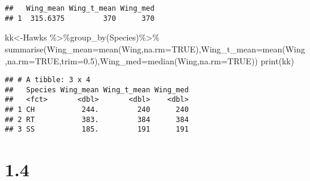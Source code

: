 \documentclass[
]{article}
\newenvironment{Shaded}{\begin{snugshade}}{\end{snugshade}}
\newcommand{\AttributeTok}[1]{\textcolor[rgb]{0.77,0.63,0.00}{#1}}
\newcommand{\ConstantTok}[1]{\textcolor[rgb]{0.00,0.00,0.00}{#1}}
\newcommand{\DecValTok}[1]{\textcolor[rgb]{0.00,0.00,0.81}{#1}}
\newcommand{\FloatTok}[1]{\textcolor[rgb]{0.00,0.00,0.81}{#1}}
\newcommand{\FunctionTok}[1]{\textcolor[rgb]{0.00,0.00,0.00}{#1}}
\newcommand{\NormalTok}[1]{#1}
\newcommand{\OtherTok}[1]{\textcolor[rgb]{0.56,0.35,0.01}{#1}}
\newcommand{\SpecialCharTok}[1]{\textcolor[rgb]{0.00,0.00,0.00}{#1}}
\begin{document}
\begin{verbatim}
##   Wing_mean Wing_t_mean Wing_med
## 1  315.6375         370      370
\end{verbatim}

\begin{Shaded}
\begin{Highlighting}[]
\NormalTok{kk}\OtherTok{\textless{}{-}}\NormalTok{Hawks }\SpecialCharTok{\%\textgreater{}\%}\FunctionTok{group\_by}\NormalTok{(Species)}\SpecialCharTok{\%\textgreater{}\%} \FunctionTok{summarise}\NormalTok{(}\AttributeTok{Wing\_mean=}\FunctionTok{mean}\NormalTok{(Wing,}\AttributeTok{na.rm=}\ConstantTok{TRUE}\NormalTok{),}\AttributeTok{Wing\_t\_mean=}\FunctionTok{mean}\NormalTok{(Wing,}\AttributeTok{na.rm=}\ConstantTok{TRUE}\NormalTok{,}\AttributeTok{trim=}\FloatTok{0.5}\NormalTok{),}\AttributeTok{Wing\_med=}\FunctionTok{median}\NormalTok{(Wing,}\AttributeTok{na.rm=}\ConstantTok{TRUE}\NormalTok{))}
\FunctionTok{print}\NormalTok{(kk)}
\end{Highlighting}
\end{Shaded}

\begin{verbatim}
## # A tibble: 3 x 4
##   Species Wing_mean Wing_t_mean Wing_med
##   <fct>       <dbl>       <dbl>    <dbl>
## 1 CH           244.         240      240
## 2 RT           383.         384      384
## 3 SS           185.         191      191
\end{verbatim}

\hypertarget{section-1}{%
\section{1.4}\label{section-1}}

\begin{Shaded}
\end{Shaded}
\end{document}
